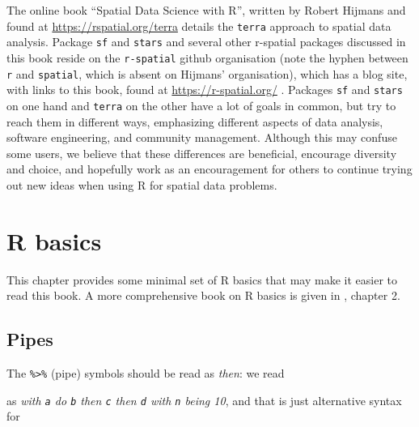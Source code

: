 \documentclass[]{book}
\newenvironment{Shaded}{\begin{snugshade}}{\end{snugshade}}
\newcommand{\DataTypeTok}[1]{\textcolor[rgb]{0.13,0.29,0.53}{#1}}
\newcommand{\DecValTok}[1]{\textcolor[rgb]{0.00,0.00,0.81}{#1}}
\newcommand{\KeywordTok}[1]{\textcolor[rgb]{0.13,0.29,0.53}{\textbf{#1}}}
\newcommand{\NormalTok}[1]{#1}
\newcommand{\OperatorTok}[1]{\textcolor[rgb]{0.81,0.36,0.00}{\textbf{#1}}}
\newcommand{\StringTok}[1]{\textcolor[rgb]{0.31,0.60,0.02}{#1}}
\begin{document}
The online book ``Spatial Data Science with R'', written by Robert
Hijmans and found at \url{https://rspatial.org/terra} details the \texttt{terra}
approach to spatial data analysis. Package \texttt{sf} and \texttt{stars} and
several other r-spatial packages discussed in this book reside on the
\texttt{r-spatial} github organisation (note the hyphen between \texttt{r} and
\texttt{spatial}, which is absent on Hijmans' organisation), which has a
blog site, with links to this book, found at \url{https://r-spatial.org/}
. Packages \texttt{sf} and \texttt{stars} on one hand and \texttt{terra} on the other have
a lot of goals in common, but try to reach them in different ways,
emphasizing different aspects of data analysis, software engineering,
and community management. Although this may confuse some users, we
believe that these differences are beneficial, encourage diversity
and choice, and hopefully work as an encouragement for others to
continue trying out new ideas when using R for spatial data problems.

\hypertarget{r-basics}{%
\chapter*{R basics}\label{r-basics}}

This chapter provides some minimal set of R basics that may make
it easier to read this book. A more comprehensive book on R basics
is given in \citep{advr}, chapter 2.

\hypertarget{pipes}{%
\section*{Pipes}\label{pipes}}

The \texttt{\%\textgreater{}\%} (pipe) symbols should be read as \emph{then}: we read

\begin{Shaded}
\end{Shaded}

as \emph{with \texttt{a} do \texttt{b} then \texttt{c} then \texttt{d} with \texttt{n} being 10}, and that is just alternative syntax for
\end{document}
